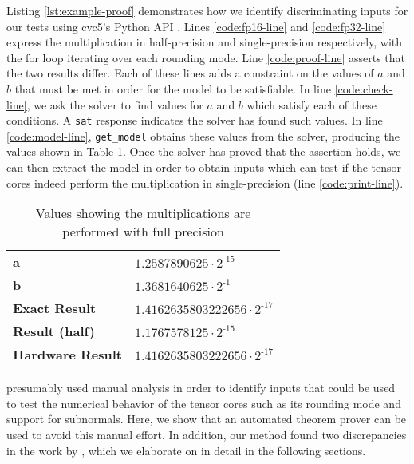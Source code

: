 Listing \ref{lst:example-proof} demonstrates how we identify discriminating inputs for our tests using cvc5's Python API \cite{cvc5}.
Lines \ref{code:fp16-line} and \ref{code:fp32-line} express the multiplication in half-precision and single-precision respectively, with the for loop iterating over each rounding mode. Line \ref{code:proof-line} asserts that the two results differ.
Each of these lines adds a constraint on the values of $a$ and $b$ that must be met in order for the model to be satisfiable.  In line \ref{code:check-line}, we ask the solver to find values for $a$ and $b$ which satisfy each of these conditions.  A \texttt{sat} response indicates the solver has found such values.  In line \ref{code:model-line}, \texttt{get\_model} obtains these values from the solver, producing the values shown in Table \ref{tab:prop-1}.
 Once the solver has proved that the assertion holds, we can then extract the model in order to obtain inputs which can test if the tensor cores indeed perform the multiplication in single-precision (line \ref{code:print-line}).
\begin{table}
 \centering
 \small
 \caption{Values showing the multiplications are performed with full precision}
 \label{tab:prop-1}
 \begin{tabular}{|l|l|}
    \hline
      \textbf{a} & $1.2587890625\cdot2^{\text{-}15}$ \\
      \textbf{b} & $1.3681640625\cdot2^{\text{-}1}$\\
      \textbf{Exact Result} & $1.4162635803222656\cdot2^{\text{-}17}$\\
      \textbf{Result (half)} & $1.1767578125\cdot2^{\text{-}15}$ \\
      \textbf{Hardware Result} & $1.4162635803222656\cdot2^{\text{-}17}$\\
      \hline
 \end{tabular}
\end{table}

\citet{fasi2021numerical} presumably used
manual analysis in order to identify inputs that could be used to test the numerical behavior of the tensor cores such as its rounding mode and support for subnormals.  Here, we show that an automated theorem prover can be used to avoid this manual effort.
In addition, our method found two discrepancies in the work by \citeauthor{fasi2021numerical}, which we elaborate on in detail in the following sections. 

